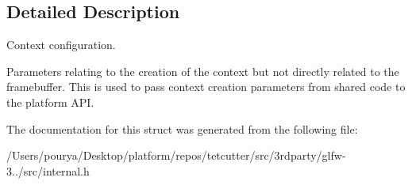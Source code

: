 \subsection{Detailed Description}
Context configuration. 

Parameters relating to the creation of the context but not directly related to the framebuffer. This is used to pass context creation parameters from shared code to the platform A\+P\+I. 

The documentation for this struct was generated from the following file\+:\begin{DoxyCompactItemize}
\item 
/\+Users/pourya/\+Desktop/platform/repos/tetcutter/src/3rdparty/glfw-\/3../src/internal.\+h\end{DoxyCompactItemize}
